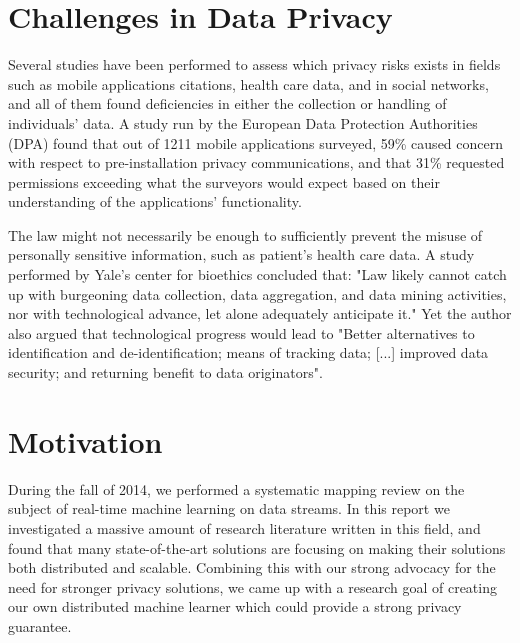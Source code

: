 

\section{Challenges in Data Privacy}

Several studies have been performed to assess which privacy risks exists in fields such as mobile applications {citations}, health care data, and in social networks, and all of them found deficiencies in either the collection or handling of individuals' data. A study run by the European Data Protection Authorities (DPA) found that out of 1211 mobile applications surveyed, 59\% caused concern with respect to pre-installation privacy communications, and that 31\%  requested permissions exceeding what the surveyors would expect based on their understanding of the applications’ functionality\cite{EUprivacySweep2014}. 

The law might not necessarily be enough to sufficiently prevent the misuse of personally sensitive information, such as patient's health care data. A study performed by Yale's center for bioethics concluded that: "Law likely cannot catch up with burgeoning data collection, data aggregation, and data
mining activities, nor with technological advance, let alone adequately anticipate it." Yet the author also argued that technological progress would lead to "Better alternatives to identification and de-identification;  means of tracking data; [...] improved data security; and returning benefit to data originators"\cite{kaplan2014patient}.

\section{Motivation}
During the fall of 2014, we performed a systematic mapping review on the subject of real-time machine learning on data streams. In this report we investigated a massive amount of research literature written in this field, and found that many state-of-the-art solutions are focusing on making their solutions both distributed and scalable\citep{asplundFroeystad2014}. Combining this with our strong advocacy for the need for stronger privacy solutions, we came up with a research goal of creating our own distributed machine learner which could provide a strong privacy guarantee.    

